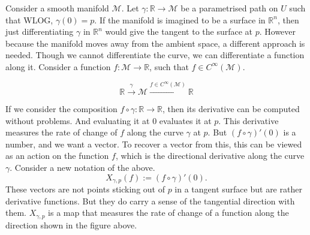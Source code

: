 \documentclass{article}
\begin{document}
Consider a smooth manifold $\mathcal{M}$. Let $\gamma: \mathbb{R} \to \mathcal{M}$ be a parametrised path on $U$ such that WLOG, $\gamma(0) = p$. If the manifold is imagined to be a surface in $\mathbb{R}^n$, then just differentiating $\gamma$ in $\mathbb{R}^n$ would give the tangent to the surface at $p$. However because the manifold moves away from the ambient space, a different approach is needed. Though we cannot differentiate the curve, we can differentiate a function along it. Consider a function $f: \mathcal{M} \to \mathbb{R}$, such that $f \in C^{\infty}(\mathcal{M})$.

\[
\mathbb{R} \xrightarrow{\gamma}
\mathcal{M}
\xrightarrow{f \in C^{\infty}(\mathcal{M})} \mathbb{R}
\]

If we consider the composition $f \circ \gamma: \mathbb{R} \to \mathbb{R}$, then its derivative can be computed without problems. And evaluating it at $0$ evaluates it at $p$. This derivative measures the rate of change of $f$ along the curve $\gamma$ at $p$. But $(f\circ \gamma)'(0)$ is a number, and we want a vector. To recover a vector from this, this can be viewed as an action on the function $f$, which is the directional derivative along the curve $\gamma$. Consider a new notation of the above.
\[
    X_{\gamma, p}(f) := (f \circ \gamma)'(0).
\]
These vectors are not points sticking out of $p$ in a tangent surface but are rather derivative functions. But they do carry a sense of the tangential direction with them. $X_{\gamma, p}$ is a map that measures the rate of change of a function along the direction shown in the figure above.
\end{document}
